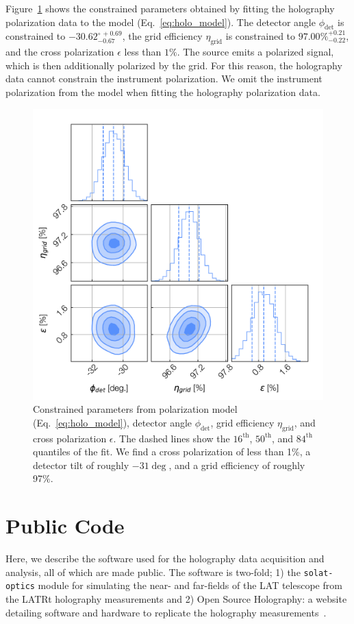 Figure~\ref{fig:holo_crosspol_params} shows the constrained parameters obtained by fitting the holography polarization data to the model (Eq.~\ref{eq:holo_model}).  The detector angle $\phi_{\text{det}}$ is constrained to $-30.62^{\circ\,+0.69}_{-0.67}$, the grid efficiency $\eta_{\text{grid}}$ is constrained to $97.00\%^{+0.21}_{-0.22}$, and the cross polarization $\epsilon$ less than $1\%$.  The source emits a polarized signal, which is then additionally polarized by the grid.  For this reason, the holography data cannot constrain the instrument polarization.  We omit the instrument polarization from the model when fitting the holography polarization data. 

\begin{figure}[ht]
    \centering
    \includegraphics[height = .8\textwidth]{Figures/pol_params.pdf}
    \caption{Constrained parameters from polarization model (Eq.~\ref{eq:holo_model}), detector angle $\phi_{\text{det}}$, grid efficiency $\eta_{\text{grid}}$, and cross polarization $\epsilon$.  The dashed lines show the $16^{\text{th}}$, $50^{\text{th}}$, and $84^{\text{th}}$ quantiles of the fit.  We find a cross polarization of less than 1\%, a detector tilt of roughly $-31\deg$, and a grid efficiency of roughly 97\%.  }
    \label{fig:holo_crosspol_params}
\end{figure}

\section{Public Code}
\label{sec:solat_code}
Here, we describe the software used for the holography data acquisition and analysis, all of which are made public.  The software is two-fold; 1) the \verb|solat-optics| module for simulating the near- and far-fields of the LAT telescope from the LATRt holography measurements and 2) Open Source Holography: a website detailing software and hardware to replicate the holography measurements~\cite{holog-exp}.

